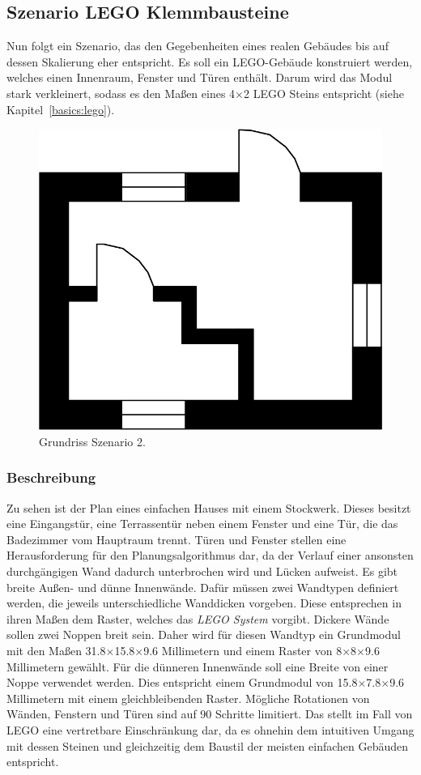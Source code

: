 \subsection{Szenario LEGO Klemmbausteine}\label{scenarios:scenario2}
Nun folgt ein Szenario, das den Gegebenheiten eines realen Gebäudes bis auf dessen Skalierung eher entspricht.
Es soll ein LEGO-Gebäude konstruiert werden, welches einen Innenraum, Fenster und Türen enthält.
Darum wird das Modul stark verkleinert, sodass es den Maßen eines 4$\times$2 LEGO Steins entspricht (siehe Kapitel~\ref{basics:lego}).

\begin{figure}[ht]
  \centering
  \includegraphics[width=0.505\columnwidth]{fig/scenario2_storey_plan.png}
  \caption{Grundriss Szenario 2.}\label{fig:scenarios:Scenario2 Gebaeudeplan}
\end{figure}

\subsubsection*{Beschreibung}
Zu sehen ist der Plan eines einfachen Hauses mit einem Stockwerk.
Dieses besitzt eine Eingangstür, eine Terrassentür neben einem Fenster und eine Tür, die das Badezimmer vom Hauptraum trennt.
Türen und Fenster stellen eine Herausforderung für den Planungsalgorithmus dar, da der Verlauf einer ansonsten durchgängigen Wand dadurch unterbrochen wird und Lücken aufweist.
Es gibt breite Außen- und dünne Innenwände.
Dafür müssen zwei Wandtypen definiert werden, die jeweils unterschiedliche Wanddicken vorgeben.
Diese entsprechen in ihren Maßen dem Raster, welches das \textit{LEGO System} vorgibt.
Dickere Wände sollen zwei Noppen breit sein.
Daher wird für diesen Wandtyp ein Grundmodul mit den Maßen 31.8$\times$15.8$\times$9.6 Millimetern und einem Raster von 8$\times$8$\times$9.6 Millimetern gewählt.
Für die dünneren Innenwände soll eine Breite von einer Noppe verwendet werden.
Dies entspricht einem Grundmodul von 15.8$\times$7.8$\times$9.6 Millimetern mit einem gleichbleibenden Raster.
Mögliche Rotationen von Wänden, Fenstern und Türen sind auf 90\textdegree{} Schritte limitiert.
Das stellt im Fall von LEGO eine vertretbare Einschränkung dar, da es ohnehin dem intuitiven Umgang mit dessen Steinen und gleichzeitig dem Baustil der meisten einfachen Gebäuden entspricht.

